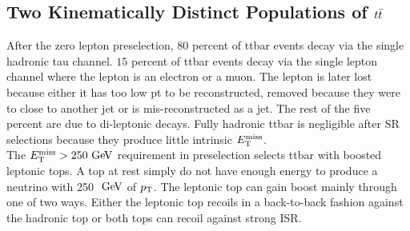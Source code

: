 \subsection{Two Kinematically Distinct Populations of $t\bar{t}$}
\label{sec:Bkg:ttbar:Pop}

\indent After the zero lepton preselection, 80 percent of ttbar events decay via the single hadronic tau channel.  $15$ percent of ttbar events decay via the single lepton channel where the lepton is an electron or a muon.  The lepton is later lost because either it has too low pt to be reconstructed, removed because they were to close to another jet or is mis-reconstructed as a jet. The rest of the five percent are due to di-leptonic decays. Fully hadronic ttbar is negligible after SR selections because they produce little intrinsic $E_{\mathrm{T}}^{\mathrm{miss}}$. \\

\indent  The $\met>250 \gev$ requirement in preselection selects ttbar with boosted leptonic tops.  A top at rest simply do not have enough energy to produce a neutrino with 250 $\gev$ of $p_{\mathrm{T}}$. The leptonic top can gain boost mainly through one of two ways.  Either the leptonic top recoils in a back-to-back fashion against the hadronic top or both tops can recoil against strong ISR.  \\




